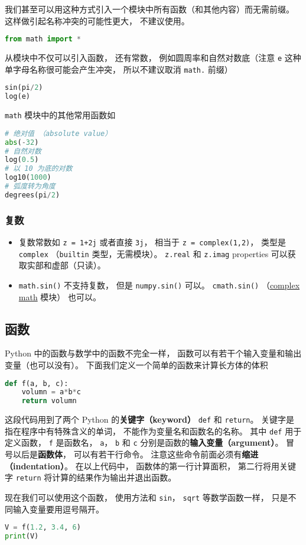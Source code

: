 我们甚至可以用这种方式引入一个模块中所有函数（和其他内容）而无需前缀。 这样做引起名称冲突的可能性更大， 不建议使用。
\begin{lstlisting}[language=python]
from math import *
\end{lstlisting}
从模块中不仅可以引入函数， 还有常数， 例如圆周率和自然对数底（注意 \verb|e| 这种单字母名称很可能会产生冲突， 所以不建议取消 \verb|math.| 前缀）
\begin{lstlisting}[language=python]
sin(pi/2)
log(e)
\end{lstlisting}

\verb|math| 模块中的其他常用函数如
\begin{lstlisting}[language=python]
# 绝对值 （absolute value）
abs(-32)
# 自然对数
log(0.5)
# 以 10 为底的对数
log10(1000)
# 弧度转为角度
degrees(pi/2)
\end{lstlisting}

\subsubsection{复数}
\begin{itemize}
\item 复数常数如 \verb|z = 1+2j| 或者直接 \verb|3j|， 相当于 \verb|z = complex(1,2)|， 类型是 \verb|complex| （\verb|builtin| 类型，无需模块）。 \verb|z.real| 和 \verb|z.imag| properties 可以获取实部和虚部（只读）。
\item \verb|math.sin()| 不支持复数， 但是 \verb|numpy.sin()| 可以。 \verb|cmath.sin()| （\href{https://docs.python.org/3/library/cmath.html}{complex math} 模块） 也可以。
\end{itemize}

\subsection{函数}
Python 中的函数与数学中的函数不完全一样， 函数可以有若干个输入变量和输出变量（也可以没有）。 下面我们定义一个简单的函数来计算长方体的体积
\begin{lstlisting}[language=python]
def f(a, b, c):
    volumn = a*b*c
    return volumn
\end{lstlisting}
这段代码用到了两个 Python 的\textbf{关键字（keyword）} \verb|def| 和 \verb|return|。 关键字是指在程序中有特殊含义的单词， 不能作为变量名和函数名的名称。 其中 \verb|def| 用于定义函数， \verb|f| 是函数名， \verb|a|， \verb|b| 和 \verb|c| 分别是函数的\textbf{输入变量（argument）}。 冒号以后是\textbf{函数体}， 可以有若干行命令。 注意这些命令前面必须有\textbf{缩进（indentation）}。  在以上代码中， 函数体的第一行计算面积， 第二行将用关键字 \verb|return| 将计算的结果作为输出并退出函数。

现在我们可以使用这个函数， 使用方法和 \verb|sin|， \verb|sqrt| 等数学函数一样， 只是不同输入变量要用逗号隔开。
\begin{lstlisting}[language=python]
V = f(1.2, 3.4, 6)
print(V)
\end{lstlisting}
